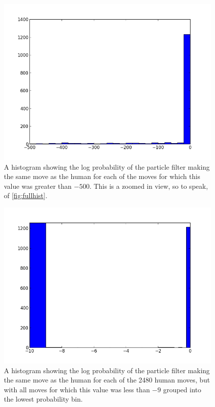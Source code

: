 \begin{figure}
\centering
\includegraphics[scale=0.75]{img/hist4.png}
\caption{A histogram showing the log probability of the particle filter making
the same move as the human for each of the moves for which this value was
greater than $-500$. This is a zoomed in view, so to speak, of
\ref{fig:fullhist}.}
\label{fig:smallhist}
\end{figure}

\begin{figure}
\centering
\includegraphics[scale=0.75]{img/hist8.png}
\caption{A histogram showing the log probability of the particle filter making
the same move as the human for each of the 2480 human moves, but with all moves
for which this value was less than $-9$ grouped into the lowest probability bin.}
\label{fig:cumulativehist}
\end{figure}

